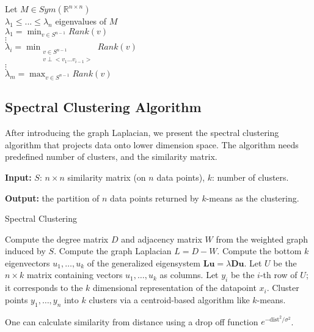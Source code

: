 {	
	\begin{theorem}
		Let $M \in Sym(\mathbb R^{n\times n})$\\
		$\lambda_1 \leq ... \leq \lambda_n$ eigenvalues of $M$ \\
		$\lambda_1 = \min_{v \in S^{n-1}} Rank (v)$\\
		$\vdots$ \\
		$\lambda_i = \min_{\substack{ v \in S^{n-1}\\
				v \perp < v_1 ... v_{i-1} >}} Rank (v)$ \\
		$\vdots$ \\
		$\lambda_m = \max_{v \in S^{n-1}} Rank (v)$
	\end{theorem}
	
	\subsection{Spectral Clustering Algorithm}
	
	After introducing the graph Laplacian, we present the spectral clustering algorithm that projects data onto lower dimension space. The algorithm needs predefined number of clusters, and the similarity matrix.
	
	\textbf{Input:} $S$: $n\times n$ similarity matrix (on $n$ data points), $k$: number of clusters.
	
	\textbf{Output:} the partition of $n$ data points returned by $k$-means as the clustering.
	
	\begin{algorithm}
		\caption{Spectral Clustering}
		\begin{algorithmic}
			\STATE Compute the degree matrix $D$ and adjacency matrix $W$ from the weighted graph induced by $S$.
			\STATE Compute the graph Laplacian $L = D - W$.
			\STATE Compute the bottom $k$ eigenvectors $u_1,\ldots,u_k$ of the generalized eigensystem $\mathbf{Lu} = \lambda \mathbf{Du}$.
			\STATE Let $U$ be the $n \times k$ matrix containing vectors $u_1,\ldots,u_k$ as columns.
			\STATE Let $y_i$ be the $i$-th row of $U$; it corresponds to the $k$ dimensional representation of the datapoint $x_i$.
			\STATE Cluster points $y_1,\ldots,y_n$ into $k$ clusters via a centroid-based algorithm like $k$-means.
		\end{algorithmic}
	\end{algorithm}
	
	One can calculate similarity from distance using a drop off function $e^{-\mathrm{dist}^2/\sigma^2}$.
	
}
